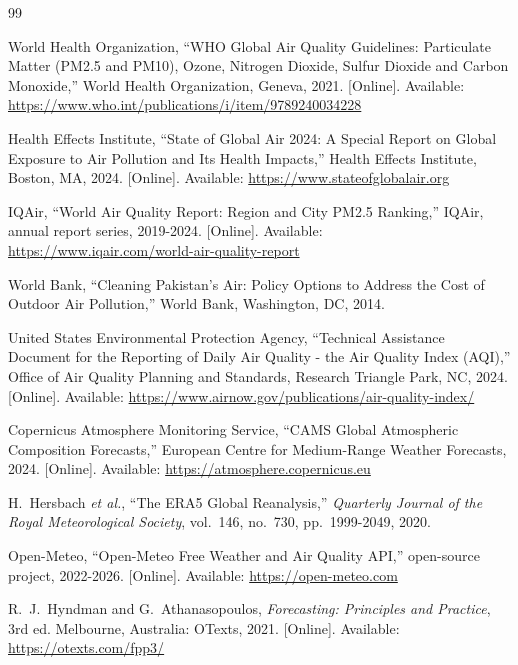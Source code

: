 \cleardoublepage
{}
{}
\begin{thebibliography}{99}
\setlength{\itemsep}{2pt}

 World Health Organization, ``WHO Global Air Quality Guidelines:
Particulate Matter (PM2.5 and PM10), Ozone, Nitrogen Dioxide, Sulfur Dioxide and
Carbon Monoxide,'' World Health Organization, Geneva, 2021. [Online]. Available:
\url{https://www.who.int/publications/i/item/9789240034228}

 Health Effects Institute, ``State of Global Air 2024: A Special
Report on Global Exposure to Air Pollution and Its Health Impacts,'' Health
Effects Institute, Boston, MA, 2024. [Online]. Available:
\url{https://www.stateofglobalair.org}

 IQAir, ``World Air Quality Report: Region and City
PM2.5 Ranking,'' IQAir, annual report series, 2019-2024. [Online]. Available:
\url{https://www.iqair.com/world-air-quality-report}

 World Bank, ``Cleaning Pakistan's Air: Policy Options to
Address the Cost of Outdoor Air Pollution,'' World Bank, Washington, DC, 2014.

 United States Environmental Protection Agency, ``Technical
Assistance Document for the Reporting of Daily Air Quality - the Air Quality
Index (AQI),'' Office of Air Quality Planning and Standards, Research Triangle
Park, NC, 2024. [Online]. Available:
\url{https://www.airnow.gov/publications/air-quality-index/}

 Copernicus Atmosphere Monitoring Service, ``CAMS Global
Atmospheric Composition Forecasts,'' European Centre for Medium-Range Weather
Forecasts, 2024. [Online]. Available: \url{https://atmosphere.copernicus.eu}

 H.~Hersbach \emph{et al.}, ``The ERA5 Global Reanalysis,''
\emph{Quarterly Journal of the Royal Meteorological Society}, vol.~146, no.~730,
pp.~1999-2049, 2020.

 Open-Meteo, ``Open-Meteo Free Weather and Air Quality
API,'' open-source project, 2022-2026. [Online]. Available:
\url{https://open-meteo.com}

 R.~J.~Hyndman and G.~Athanasopoulos, \emph{Forecasting:
Principles and Practice}, 3rd ed. Melbourne, Australia: OTexts, 2021. [Online].
Available: \url{https://otexts.com/fpp3/}


\end{thebibliography}
